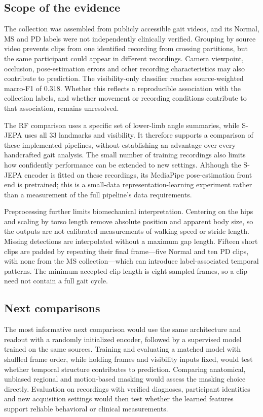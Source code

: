\documentclass[10pt,twocolumn,letterpaper]{article}
\begin{document}
\subsection{Scope of the evidence}
The collection was assembled from publicly accessible gait videos, and its Normal, MS and PD labels were not independently clinically verified. Grouping by source video prevents clips from one identified recording from crossing partitions, but the same participant could appear in different recordings. Camera viewpoint, occlusion, pose-estimation errors and other recording characteristics may also contribute to prediction. The visibility-only classifier reaches source-weighted macro-F1 of 0.318. Whether this reflects a reproducible association with the collection labels, and whether movement or recording conditions contribute to that association, remains unresolved.

The RF comparison uses a specific set of lower-limb angle summaries, while S-JEPA uses all 33 landmarks and visibility. It therefore supports a comparison of these implemented pipelines, without establishing an advantage over every handcrafted gait analysis. The small number of training recordings also limits how confidently performance can be extended to new settings. Although the S-JEPA encoder is fitted on these recordings, its MediaPipe pose-estimation front end is pretrained; this is a small-data representation-learning experiment rather than a measurement of the full pipeline's data requirements.

Preprocessing further limits biomechanical interpretation. Centering on the hips and scaling by torso length remove absolute position and apparent body size, so the outputs are not calibrated measurements of walking speed or stride length. Missing detections are interpolated without a maximum gap length. Fifteen short clips are padded by repeating their final frame---five Normal and ten PD clips, with none from the MS collection---which can introduce label-associated temporal patterns. The minimum accepted clip length is eight sampled frames, so a clip need not contain a full gait cycle.

\subsection{Next comparisons}
The most informative next comparison would use the same architecture and readout with a randomly initialized encoder, followed by a supervised model trained on the same sources. Training and evaluating a matched model with shuffled frame order, while holding frames and visibility inputs fixed, would test whether temporal structure contributes to prediction. Comparing anatomical, unbiased regional and motion-based masking would assess the masking choice directly. Evaluation on recordings with verified diagnoses, participant identities and new acquisition settings would then test whether the learned features support reliable behavioral or clinical measurements.
\end{document}
